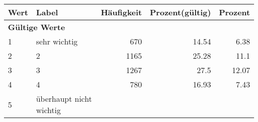      \begin{longtable}{lXrrr}
     \toprule
     \textbf{Wert} & \textbf{Label} & \textbf{Häufigkeit} & \textbf{Prozent(gültig)} & \textbf{Prozent} \\
     \endhead
     \midrule
     \multicolumn{5}{l}{\textbf{Gültige Werte}}\\

     1 &
     \multicolumn{1}{X}{ sehr wichtig   } &


       \num{670} &
       \num[round-mode=places,round-precision=2]{14.54} &
         \num[round-mode=places,round-precision=2]{6.38} \\

     2 &
     \multicolumn{1}{X}{ 2   } &


       \num{1165} &
       \num[round-mode=places,round-precision=2]{25.28} &
         \num[round-mode=places,round-precision=2]{11.1} \\

     3 &
     \multicolumn{1}{X}{ 3   } &


       \num{1267} &
       \num[round-mode=places,round-precision=2]{27.5} &
         \num[round-mode=places,round-precision=2]{12.07} \\

     4 &
     \multicolumn{1}{X}{ 4   } &


       \num{780} &
       \num[round-mode=places,round-precision=2]{16.93} &
         \num[round-mode=places,round-precision=2]{7.43} \\

     5 &
     \multicolumn{1}{X}{ überhaupt nicht wichtig   } &



\end{longtable}
